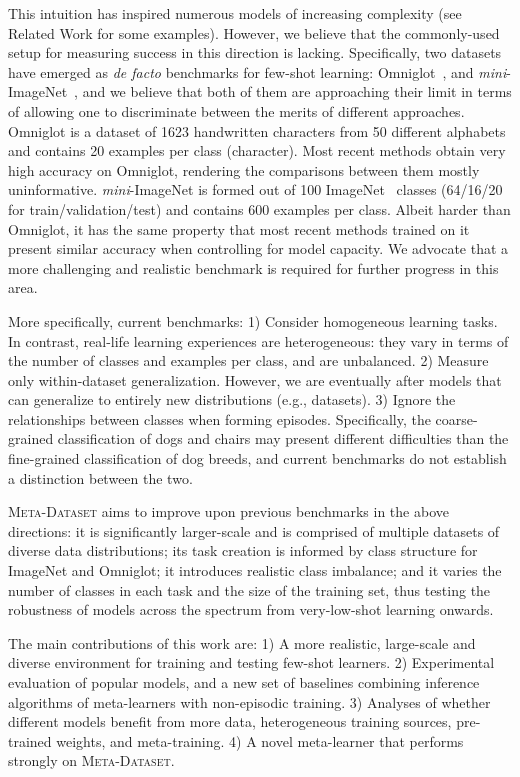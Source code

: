 \documentclass{article} \usepackage{iclr2020_conference,times}
\newcommand{\benchmark}{\textsc{Meta-Dataset}\xspace}
\begin{document}
This intuition has inspired numerous models of increasing complexity (see Related Work for some examples). However, we believe that the
commonly-used setup for measuring success in this direction is lacking.
Specifically, two datasets have emerged as {\em de facto}
benchmarks for few-shot learning: Omniglot~\citep{lake2015human}, and {\em
mini}-ImageNet~\citep{vinyals2016matching}, and we believe that both of them
are approaching their limit in terms of allowing one to discriminate between
the merits of different approaches. Omniglot is a dataset of 1623 handwritten
characters from 50 different alphabets and contains 20 examples per class
(character). Most recent methods obtain very high accuracy on Omniglot,
rendering the comparisons between them mostly uninformative. {\em
mini}-ImageNet is formed out of 100 ImageNet~\citep{russakovsky2015imagenet}
classes (64/16/20 for train/validation/test) and contains 600 examples per
class. Albeit harder than Omniglot, it has the same property that most recent
methods trained on it present similar accuracy when controlling for model
capacity. We advocate that a more challenging and realistic benchmark is
required for further progress in this area.

More specifically, current benchmarks: 1) Consider homogeneous learning tasks. In contrast, real-life learning experiences are heterogeneous: they vary in terms of the number of classes and examples per class, and are unbalanced. 2) Measure only within-dataset generalization. However, we are eventually after models that can generalize to entirely new distributions (e.g., datasets). 3) Ignore the relationships between classes when forming episodes. Specifically, the coarse-grained classification of dogs and chairs may present different difficulties than the fine-grained classification of dog breeds, and current benchmarks do not establish a distinction between the two.

\benchmark aims to improve upon previous benchmarks in the above directions: it
is significantly larger-scale and is comprised of multiple datasets of diverse
data distributions; its task creation is informed by class structure for
ImageNet and Omniglot; it introduces realistic class imbalance; and it varies
the number of classes in each task and the size of the training set, thus
testing the robustness of models across the spectrum from very-low-shot
learning onwards.

The main contributions of this work are:
1) A more realistic, large-scale and diverse environment for training and testing few-shot learners.
2) Experimental evaluation of popular models, and a new set of baselines combining inference algorithms of meta-learners with non-episodic training.
3) Analyses of whether different models benefit from more data, heterogeneous training sources, pre-trained weights, and meta-training.
4) A novel meta-learner that performs strongly on \benchmark.
\end{document}
